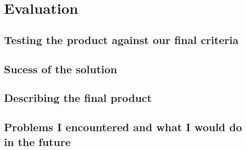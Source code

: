 \documentclass[9pt]{article}
\begin{document}
\newpage
\section{Evaluation}












\newpage
\subsection{Testing the product against our final criteria}











\newpage
\subsection{Sucess of the solution}











\newpage
\subsection{Describing the final product}












\newpage
\subsection{Problems I encountered and what I would do in the future}











\newpage
{}

\end{document}
